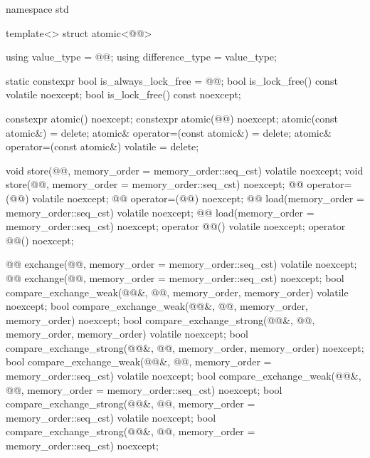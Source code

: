 \begin{codeblock}
namespace std {
  template<> struct atomic<@@> {
    using value_type = @@;
    using difference_type = value_type;

    static constexpr bool is_always_lock_free = @@;
    bool is_lock_free() const volatile noexcept;
    bool is_lock_free() const noexcept;

    constexpr atomic() noexcept;
    constexpr atomic(@@) noexcept;
    atomic(const atomic&) = delete;
    atomic& operator=(const atomic&) = delete;
    atomic& operator=(const atomic&) volatile = delete;

    void store(@@, memory_order = memory_order::seq_cst) volatile noexcept;
    void store(@@, memory_order = memory_order::seq_cst) noexcept;
    @@ operator=(@@) volatile noexcept;
    @@ operator=(@@) noexcept;
    @@ load(memory_order = memory_order::seq_cst) volatile noexcept;
    @@ load(memory_order = memory_order::seq_cst) noexcept;
    operator @@() volatile noexcept;
    operator @@() noexcept;

    @@ exchange(@@,
                            memory_order = memory_order::seq_cst) volatile noexcept;
    @@ exchange(@@,
                            memory_order = memory_order::seq_cst) noexcept;
    bool compare_exchange_weak(@@&, @@,
                               memory_order, memory_order) volatile noexcept;
    bool compare_exchange_weak(@@&, @@,
                               memory_order, memory_order) noexcept;
    bool compare_exchange_strong(@@&, @@,
                                 memory_order, memory_order) volatile noexcept;
    bool compare_exchange_strong(@@&, @@,
                                 memory_order, memory_order) noexcept;
    bool compare_exchange_weak(@@&, @@,
                               memory_order = memory_order::seq_cst) volatile noexcept;
    bool compare_exchange_weak(@@&, @@,
                               memory_order = memory_order::seq_cst) noexcept;
    bool compare_exchange_strong(@@&, @@,
                                 memory_order = memory_order::seq_cst) volatile noexcept;
    bool compare_exchange_strong(@@&, @@,
                                 memory_order = memory_order::seq_cst) noexcept;

}}
\end{codeblock}
